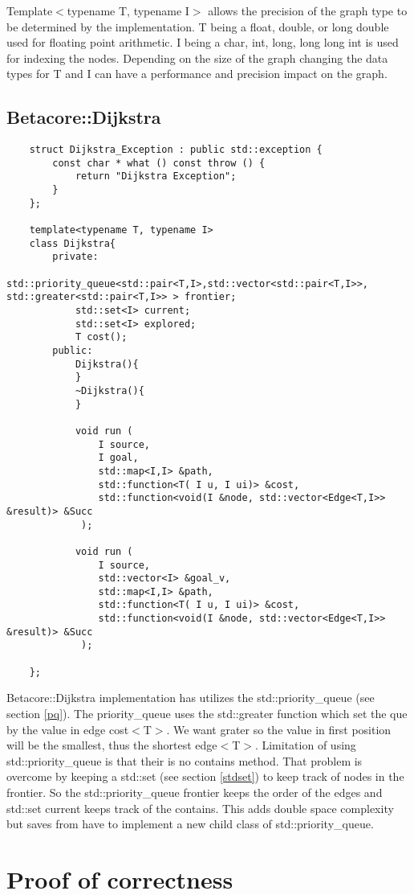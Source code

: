 \documentclass[12pt]{article}
\begin{document}
Template$<$typename T, typename I$>$ allows the precision of the graph type to 
be determined by the implementation. T being a float, double, or long double
used for floating point arithmetic. I being a char, int, long, long long int is
used for indexing the nodes. Depending on the size of the graph changing the 
data types for T and I can have a performance and precision impact on the graph.

\subsection{Betacore::Dijkstra}
\begin{lstlisting}
	struct Dijkstra_Exception : public std::exception {
		const char * what () const throw () {
			return "Dijkstra Exception";
		}
	};

	template<typename T, typename I>
	class Dijkstra{
		private:
			std::priority_queue<std::pair<T,I>,std::vector<std::pair<T,I>>, std::greater<std::pair<T,I>> > frontier;
			std::set<I> current; 
			std::set<I> explored;
			T cost();
		public:
			Dijkstra(){
			}
			~Dijkstra(){
			}
		
			void run (
				I source,
				I goal,
				std::map<I,I> &path,
				std::function<T( I u, I ui)> &cost,
				std::function<void(I &node, std::vector<Edge<T,I>> &result)> &Succ
			 );
		
			void run (
				I source,
				std::vector<I> &goal_v,
				std::map<I,I> &path,
				std::function<T( I u, I ui)> &cost,
				std::function<void(I &node, std::vector<Edge<T,I>> &result)> &Succ
			 );
	
	};
\end{lstlisting}

Betacore::Dijkstra implementation has utilizes the std::priority\_queue (see section \ref{pq}).
The priority\_queue uses the std::greater function which set the que by the value in edge cost$<$T$>$. We want grater
so the value in first position will be the smallest, thus the shortest edge$<$T$>$. 
Limitation of using std::priority\_queue is that their is no contains method. That 
problem is overcome by keeping a std::set (see section \ref{stdset}) to keep track of nodes in the frontier.
So the std::priority\_queue frontier keeps the order of the edges and std::set current keeps track of the contains.
This adds double space complexity but saves from have to implement a new child class of std::priority\_queue.

\section[Proof of correctness]{Proof of correctness}



\end{document}
